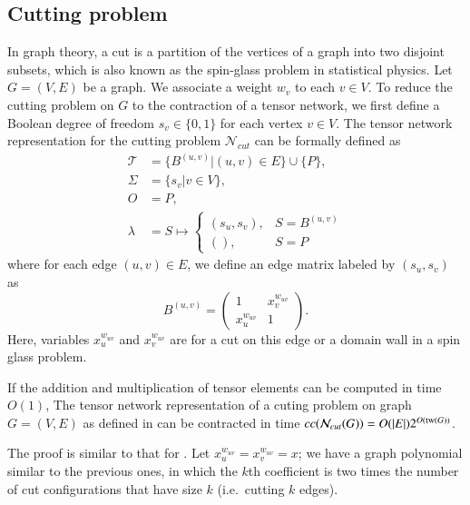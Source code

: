 \documentclass[review, onefignum, onetabnum]{siamart190516}
\begin{document}
\subsection{Cutting problem}
In graph theory, a cut is a partition of the vertices of a graph into two disjoint subsets,
which is also known as the spin-glass problem in statistical physics.
Let $G=(V,E)$ be a graph. We associate a weight $w_v$ to each $v\in V$. To reduce the cutting problem on $G$ to the contraction of a tensor network, we first define a Boolean degree of freedom $s_v\in\{0, 1\}$ for each vertex $v\in V$.
The tensor network representation for the cutting problem $\mathcal{N}_{cut}$ can be formally defined as
\begin{equation}\label{eq:cuttensornetwork}
\begin{split}
    \mathcal{T} &= \{B^{(u, v)} | (u, v) \in E\} \cup \{P\},\\
    \Sigma &= \{s_v | v \in V\},\\
    O &= P,\\
    \lambda &= S \mapsto \begin{cases}
                    (s_u, s_v), & S = B^{(u, v)}\\
                    (), & S = P
                    \end{cases}
\end{split}
\end{equation}
where for each edge $(u,v)\in E$, we define an edge matrix labeled by $(s_u, s_v)$ as
\begin{equation}
    B^{(u, v)} = \left(\begin{matrix}
        1 & x_{v}^{w_{uv}}\\
        x_{u}^{w_{uv}} & 1
    \end{matrix}\right).
\end{equation}
Here, variables $x_u^{w_{uv}}$ and $x_v^{w_{uv}}$ are for a cut on this edge or a domain wall in a spin glass problem.
\begin{theorem}\label{thm:colorcomplex}
    If the addition and multiplication of tensor elements can be computed in time $O(1)$,
    The tensor network representation of a cuting problem on graph $G=(V,E)$ as defined in  can be contracted in time $cc(\mathcal{N}_{cut}(G)) = O(|E|)2^{O({\rm tw}(G))}$.
\end{theorem}
The proof is similar to that for .
Let $x_u^{w_{uv}} = x_v^{w_{uv}} = x$; we have a graph polynomial similar to the previous ones,
in which the $k$th coefficient is two times the number of cut configurations that have size $k$ (i.e.\ cutting $k$ edges).
\end{document}
